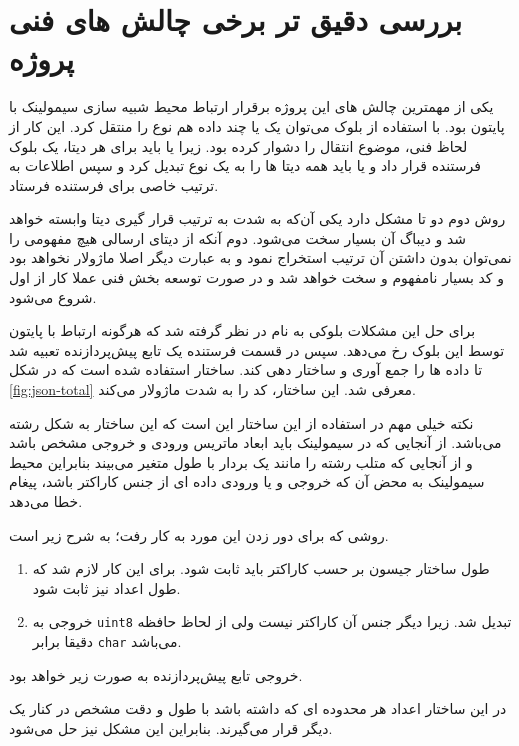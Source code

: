 \section{بررسی دقیق تر برخی چالش های فنی پروژه}\label{ch:fani|sec:chalenges}

یکی از مهمترین چالش های این پروژه برقرار ارتباط محیط شبیه سازی سیمولینک با پایتون بود. با استفاده از بلوک  می‌توان یک یا چند داده هم نوع را منتقل کرد. این کار از لحاظ فنی، موضوع انتقال را دشوار کرده بود. زیرا یا باید برای هر دیتا، یک بلوک فرستنده قرار داد و یا باید همه دیتا ها را به یک نوع تبدیل کرد و سپس اطلاعات به ترتیب خاصی برای فرستنده فرستاد. 

روش دوم دو تا مشکل دارد یکی آن‌که به شدت به ترتیب قرار گیری دیتا وابسته خواهد شد و دیباگ آن بسیار سخت می‌شود. دوم آنکه از دیتای ارسالی هیچ مفهومی را نمی‌توان بدون داشتن آن ترتیب استخراج نمود و به عبارت دیگر اصلا ماژولار نخواهد بود و کد بسیار نامفهوم و سخت خواهد شد و در صورت توسعه بخش فنی عملا کار از اول شروع می‌شود.

برای حل این مشکلات بلوکی به نام  در نظر گرفته شد که هرگونه ارتباط با پایتون توسط این بلوک رخ می‌دهد. سپس در قسمت فرستنده یک تابع پیش‌پردازنده تعبیه شد تا داده ها را جمع آوری و ساختار دهی کند. ساختار استفاده شده  است که در شکل \ref{fig:json-total} معرفی شد. این ساختار، کد را به شدت ماژولار می‌کند.

نکته خیلی مهم در استفاده از این ساختار این است که این ساختار به شکل رشته می‌باشد. از آنجایی که در سیمولینک باید ابعاد ماتریس ورودی و خروجی مشخص باشد و از آنجایی که متلب رشته را مانند یک بردار با طول متغیر می‌بیند بنابراین محیط سیمولینک به محض آن که خروجی و یا ورودی داده ای از جنس کاراکتر باشد، پیغام خطا می‌دهد.

روشی که برای دور زدن این مورد به کار رفت؛ به شرح زیر است.

\begin{enumerate}
	\item 
	طول ساختار جیسون بر حسب کاراکتر باید ثابت شود. برای این کار لازم شد که طول اعداد نیز ثابت شود.
	\item 
		خروجی به \texttt{uint8} تبدیل شد. زیرا دیگر جنس آن کاراکتر نیست ولی از لحاظ حافظه دقیقا برابر \texttt{char} می‌باشد.
	
\end{enumerate} 

خروجی تابع پیش‌پردازنده به صورت زیر خواهد بود.




در این ساختار اعداد هر محدوده ای که داشته باشد با طول و دقت مشخص در کنار یک دیگر قرار می‌گیرند. بنابراین این مشکل نیز حل می‌شود. 

 
